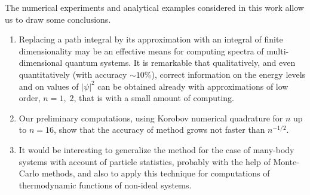 \documentclass[11pt]{article}
\begin{document}
The numerical experiments and analytical examples considered in this work allow us to draw some conclusions.

\begin{enumerate}
\item  Replacing a path integral by its approximation with an integral of
finite dimensionality may be an effective means for computing spectra
of multi-dimensional quantum systems.
It is remarkable that qualitatively, and even quantitatively
(with accuracy
$\sim 10$\%), correct information
on the energy levels and on values of
$|\psi|^2$  can be obtained already with approximations of low order,
$n=1, \; 2$, that is with a small amount of computing.
\item Our preliminary computations, using Korobov numerical quadrature for
$n$ up to $n=16$, show that the accuracy of method grows not faster than
$n^{-1/2}$.
\item It would be interesting to generalize the method for the case of
many-body systems with account of particle statistics, probably with the help
of Monte-Carlo methods, and also to apply this technique for computations
of thermodynamic functions of non-ideal systems.
\end{enumerate}
\end{document}
